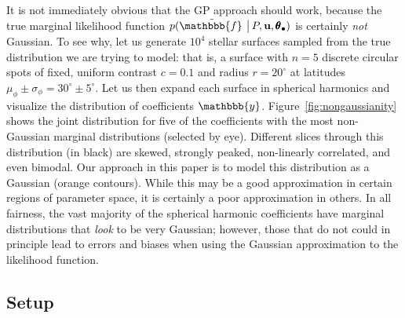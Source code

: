 \documentclass[modern]{aastex62}
\begin{document}
It is not immediately obvious that the GP approach should work, because the
true marginal likelihood function
%
$p ( \tilde{\mathbbb{f}\hspace{0.2em}} \, \big| \, P, \mathbf{u}, \pmb{\theta}_\bullet )$
%
is certainly \emph{not} Gaussian. To see why, let us generate $10^{4}$ stellar
surfaces sampled from the true distribution we are trying to model: that is,
a surface with $n=5$ discrete circular spots of fixed, uniform contrast $c=0.1$
and radius $r=20^\circ$ at latitudes $\mu_\phi \pm \sigma_\phi = 30^\circ \pm 5^\circ$.
Let us then expand each surface in spherical harmonics and visualize the
distribution of coefficients $\mathbbb{y}$. Figure~\ref{fig:nongaussianity}
shows the joint distribution for five of the coefficients with the most
non-Gaussian marginal distributions (selected by eye). Different slices
through this distribution
(in black) are skewed, strongly peaked, non-linearly correlated, and even bimodal.
Our approach in this paper is to model this distribution as a Gaussian
(orange contours). While this may be a good approximation in certain regions
of parameter space, it is certainly a poor approximation in others.
In all fairness, the vast majority of the spherical harmonic coefficients
have marginal distributions that \emph{look} to be very Gaussian; however,
those that do not could in principle lead to errors and biases when using
the Gaussian approximation to the likelihood function.

\subsection{Setup}
\label{sec:calibration-setup}
\end{document}
